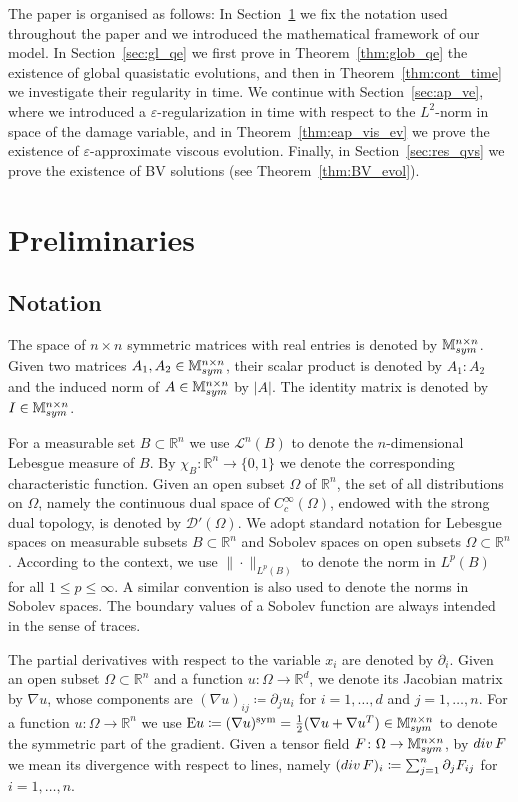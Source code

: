 \documentclass[reqno]{amsart}
\theoremstyle{definition}
\numberwithin{equation}{section}
\def\div {\mathop {\rm div}\nolimits}
\def\R {\mathbb R}
\def\M {\mathbb M^{n\times n}_{\rm sym}}
\def\EE {\mathrm{E}}
\begin{document}
The paper is organised as follows: In Section~\ref{sec:prel} we fix the notation used throughout the paper and we introduced the mathematical framework of our model. In Section~\ref{sec:gl_qe} we first prove in Theorem~\ref{thm:glob_qe} the existence of global quasistatic evolutions, and then in Theorem~\ref{thm:cont_time} we investigate their regularity in time. We continue with Section~\ref{sec:ap_ve}, where we introduced a $\varepsilon$-regularization in time with respect to the $L^2$-norm in space of the damage variable, and in Theorem~\ref{thm:eap_vis_ev} we prove the existence of $\varepsilon$-approximate viscous evolution. Finally, in Section~\ref{sec:res_qvs} we prove the existence of BV solutions (see Theorem~\ref{thm:BV_evol}). 

\section{Preliminaries}\label{sec:prel}

\subsection{Notation} The space of $n\times n$ symmetric matrices with real entries is denoted by $\M$. Given two matrices $A_1,A_2\in \M$, their scalar product is denoted by $A_1\colon A_2$ and the induced norm of $A\in\M$ by $|A|$. The identity matrix is denoted by $I \in \M$. 

For a measurable set $B \subset \R^n$ we use $\mathcal L^n(B)$ to denote the $n$-dimensional Lebesgue measure of $B$. By $\chi_B\colon \R^n \to \{ 0 ,1 \}$ we denote the corresponding characteristic function.  Given an open subset $\Omega$ of $\R^n$, the set of all distributions on $\Omega$, namely the continuous dual space of $C_c^\infty (\Omega)$, endowed with the strong dual topology, is denoted by $\mathcal D'(\Omega)$. We adopt standard notation for Lebesgue spaces on measurable subsets $B\subset\mathbb R^n$ and Sobolev spaces on open subsets $\Omega\subset\mathbb R^n$. According to the context, we use $\|\cdot\|_{L^p(B)}$ to denote the norm in $L^p(B)$ for all $1\le p\le\infty$. A similar convention is also used to denote the norms in Sobolev spaces. The boundary values of a Sobolev function are always intended in the sense of traces.

The partial derivatives with respect to the variable $x_i$ are denoted by $\partial_i$. Given an open subset $\Omega\subset\mathbb R^n$ and a function $u\colon\Omega\to\R^d$, we denote its Jacobian matrix by $\nabla u$, whose components are $(\nabla u)_{ij}\coloneqq\partial_j u_i$ for $i=1,\dots,d$ and $j=1,\dots,n$. For a function $u\colon \Omega \to \R^n$ we use $\EE u\coloneqq(\nabla u)^{\mathrm{sym}}=\frac{1}{2}(\nabla u+\nabla u^T)\in\M$ to denote the symmetric part of the gradient. Given a tensor field $F\colon \Omega\to\M$, by $\div F$ we mean its divergence with respect to lines, namely $(\div F)_i\coloneqq\sum_{j=1}^n\partial_jF_{ij}$ for $i=1,\dots,n$. 
\end{document}
